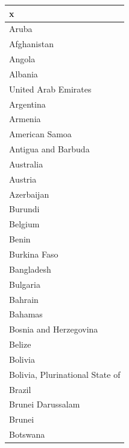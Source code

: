 \documentclass[]{article}
\newenvironment{Shaded}{\begin{snugshade}}{\end{snugshade}}
\newcommand{\ControlFlowTok}[1]{\textcolor[rgb]{0.13,0.29,0.53}{\textbf{#1}}}
\newcommand{\DecValTok}[1]{\textcolor[rgb]{0.00,0.00,0.81}{#1}}
\newcommand{\KeywordTok}[1]{\textcolor[rgb]{0.13,0.29,0.53}{\textbf{#1}}}
\newcommand{\NormalTok}[1]{#1}
\newcommand{\OperatorTok}[1]{\textcolor[rgb]{0.81,0.36,0.00}{\textbf{#1}}}
\newcommand{\StringTok}[1]{\textcolor[rgb]{0.31,0.60,0.02}{#1}}
\begin{document}
\begin{Shaded}
\end{Shaded}

\begin{table}

\centering
\begin{tabular}[t]{l}
\hline
x\\
\hline
Aruba\\
\hline
Afghanistan\\
\hline
Angola\\
\hline
Albania\\
\hline
United Arab Emirates\\
\hline
Argentina\\
\hline
Armenia\\
\hline
American Samoa\\
\hline
Antigua and Barbuda\\
\hline
Australia\\
\hline
Austria\\
\hline
Azerbaijan\\
\hline
Burundi\\
\hline
Belgium\\
\hline
Benin\\
\hline
Burkina Faso\\
\hline
Bangladesh\\
\hline
Bulgaria\\
\hline
Bahrain\\
\hline
Bahamas\\
\hline
Bosnia and Herzegovina\\
\hline
Belize\\
\hline
Bolivia\\
\hline
Bolivia, Plurinational State of\\
\hline
Brazil\\
\hline
Brunei Darussalam\\
\hline
Brunei\\
\hline
Botswana\\

\end{tabular}
\end{table}
\end{document}
